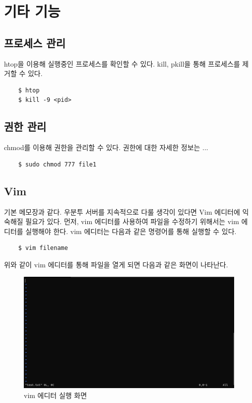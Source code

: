\section{기타 기능}
\subsection{프로세스 관리}
htop을 이용해 실행중인 프로세스를 확인할 수 있다. kill, pkill을 통해 프로세스를 제거할 수 있다.
    \begin{lstlisting}
    $ htop
    $ kill -9 <pid>
    \end{lstlisting}
\subsection{권한 관리}
chmod를 이용해 권한을 관리할 수 있다. 권한에 대한 자세한 정보는 ...
    \begin{lstlisting}
    $ sudo chmod 777 file1
    \end{lstlisting}
\subsection{Vim}
기본 메모장과 같다. 우분투 서버를 지속적으로 다룰 생각이 있다면 Vim 에디터에 익숙해질 필요가 있다. 먼저, vim 에디터를 사용하여 파일을 수정하기 위해서는 vim 에디터를 실행해야 한다. vim 에디터는 다음과 같은 명령어를 통해 실행할 수 있다.
    \begin{lstlisting}
    $ vim filename
    \end{lstlisting}
위와 같이 vim 에디터를 통해 파일을 열게 되면 다음과 같은 화면이 나타난다.

\begin{figure}[H]
	\begin{center}
        \includegraphics[width=0.8\linewidth]{chap3/images/vim.png}
        \caption{vim 에디터 실행 화면}
    \end{center}
\end{figure}


